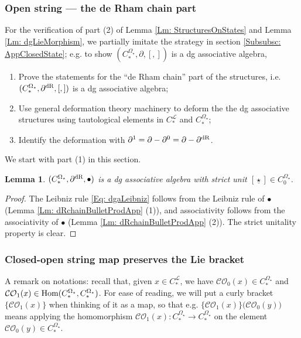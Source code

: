 \documentclass[10pt]{amsart}
\numberwithin{equation}{section}
\theoremstyle{plain}
\newtheorem{lemma}[theorem]{Lemma}
\theoremstyle{definition}
\theoremstyle{remark}
\numberwithin{equation}{section}
\newcommand{\Hom}{\textup{Hom}}
\newcommand{\dR}{\textup{dR}}
\newcommand{\CO}{\mathcal{CO}}
\newcommand{\CFr}{C_*^\mathscr{L}}
\newcommand{\CBa}{C_*^{\Omega_\star}}
\newcommand{\Cba}[1]{C_{#1}^{\Omega_\star}}
\begin{document}
{\subsubsection{Open string --- the de Rham chain part}
For the verification of part (2) of Lemma \ref{Lm: StructuresOnStates} and Lemma \ref{Lm: dgLieMorphism}, we partially imitate the strategy in section \ref{Subsubsc: AppClosedState}; e.g. to show $(\CBa,\partial,[,])$ is a dg associative algebra,
\begin{enumerate}
	\item Prove the statements for the ``de Rham chain'' part of the structures, i.e. $(\CBa, \partial^\dR, [,])$ is a dg associative algebra;
	\item Use general deformation theory machinery to deform the the dg associative structures using tautological elements in $\CFr$ and $\CBa$;
	\item Identify the deformation with $\partial^1 = \partial - \partial^0=\partial - \partial^\dR$.
\end{enumerate}


We start with part (1) in this section.

\begin{lemma}
	$(\CBa,\partial^\dR, \bullet)$ is a dg associative algebra with strict unit $[\underline{\star}]\in \Cba{0}$.
\end{lemma}
\begin{proof}
	The Leibniz rule \eqref{Eq: dgaLeibniz} follows from the Leibniz rule of $\bullet$ (Lemma \ref{Lm: dRchainBulletProdApp} (1)), and 
	associativity follows from the associativity of $\bullet$ (Lemma \ref{Lm: dRchainBulletProdApp} (2)).
	The strict unitality property is clear.
\end{proof}




\subsubsection{Closed-open string map preserves the Lie bracket}






A remark on notations:
recall that, given $x\in \CFr$, we have $\CO_0(x) \in \CBa$ and $\CO_1(x)\in \Hom(\CBa,\CBa)$. For ease of reading, we will put a curly bracket $\big\{\CO_1(x)\big\}$ when thinking of it as a map, so that e.g. $\big\{\CO_1(x)\big\} \big(\CO_0(y)\big)$ means applying the homomorphism $\CO_1(x)\colon \CBa\to \CBa$ on the element $\CO_0(y)\in \CBa$.


}
\end{document}
